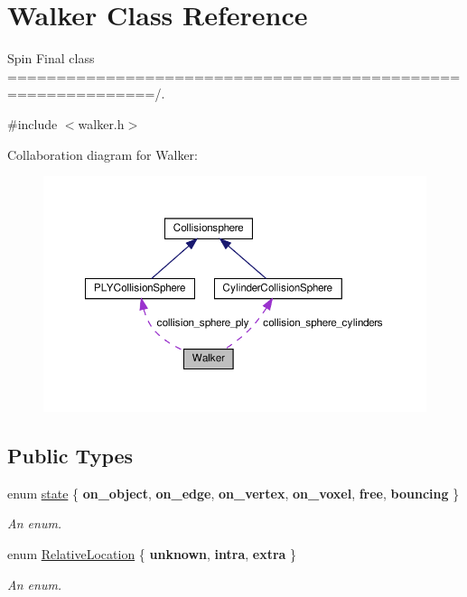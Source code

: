 \hypertarget{class_walker}{}\section{Walker Class Reference}
\label{class_walker}


Spin Final class =============================================================/.  




{\ttfamily \#include $<$walker.\+h$>$}



Collaboration diagram for Walker\+:
\nopagebreak
\begin{figure}[H]
\begin{center}
\leavevmode
\includegraphics[width=350pt]{class_walker__coll__graph}
\end{center}
\end{figure}
\subsection*{Public Types}
\begin{DoxyCompactItemize}
\item 
enum \hyperlink{class_walker_afcad3f5c11d0bd045de22fb0347dc44c}{state} \{ \newline
{\bfseries on\+\_\+object}, 
{\bfseries on\+\_\+edge}, 
{\bfseries on\+\_\+vertex}, 
{\bfseries on\+\_\+voxel}, 
\newline
{\bfseries free}, 
{\bfseries bouncing}
 \}\begin{DoxyCompactList}\small\item\em An enum. \end{DoxyCompactList}
\item 
enum \hyperlink{class_walker_a24246136a10754791b05cb570dbb8417}{Relative\+Location} \{ {\bfseries unknown}, 
{\bfseries intra}, 
{\bfseries extra}
 \}\begin{DoxyCompactList}\small\item\em An enum. \end{DoxyCompactList}
\end{DoxyCompactItemize}
